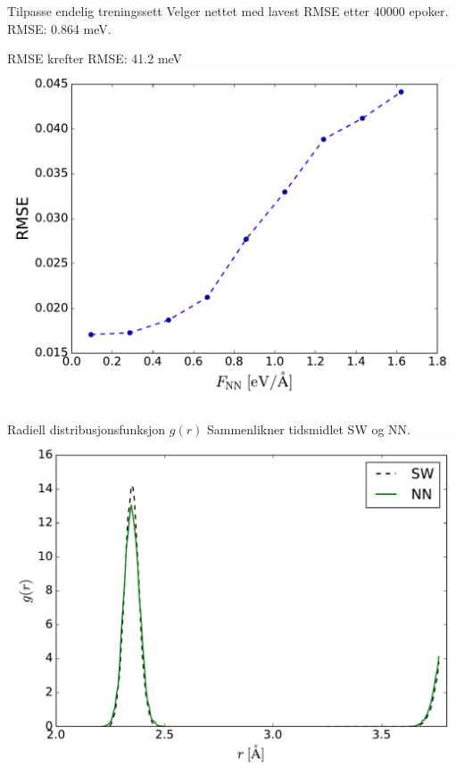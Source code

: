 \documentclass{beamer}
\begin{document}
\begin{frame}
 
\begin{block}{Tilpasse endelig treningssett}
 Velger nettet med lavest RMSE etter 40000 epoker. RMSE: 0.864 meV.
\end{block}

\begin{block}{RMSE krefter}
 \centering
 RMSE: 41.2 meV
 \includegraphics[width = 0.7\linewidth]{../Figures/Results/SiForces.pdf}
\end{block}

\end{frame}


\begin{frame}

\begin{block}{Radiell distribusjonsfunksjon $g(r)$}
 Sammenlikner tidsmidlet SW og NN.
 \centering
 \includegraphics[width = 0.7\linewidth]{../Figures/Results/radialDist.pdf}
\end{block}

\end{frame}
\end{document}
